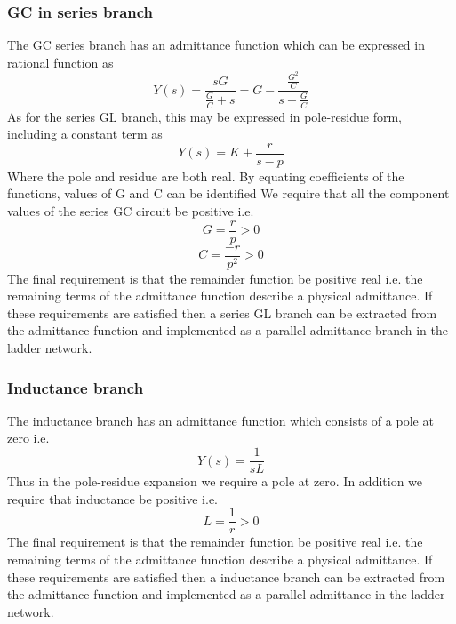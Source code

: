 \subsubsection{GC in series branch}

The GC series branch has an admittance function which can be expressed in rational function as
\begin{equation} 
Y\left(s\right)=\frac{sG}{\frac{G}{C} + s}=G-\frac{\frac{G^2}{C}}{s+\frac{G}{C}}
\end{equation}
As for the series GL branch, this may be expressed in pole-residue form, including a constant term as
\begin{equation} 
Y\left(s\right)= K+\frac{r}{s-p}
\end{equation}
Where the pole and residue are both real. By equating coefficients of the functions, values of G and C can be identified
We require that all the component values of the series GC circuit be positive i.e.
\begin{equation} 
G=\frac{r}{p}>0
\end{equation}
\begin{equation} 
C=\frac{-r}{p^2}>0
\end{equation}
The final requirement is that the remainder function be positive real i.e. the remaining terms of the admittance function describe a physical admittance. If these requirements are satisfied then a series GL branch can be extracted from the admittance function and implemented as a parallel admittance branch in the ladder network. 


\subsubsection{Inductance branch}

The inductance branch has an admittance function which consists of a pole at zero i.e.
\begin{equation} 
Y\left(s\right)=\frac{1}{sL}
\end{equation}
Thus in the pole-residue expansion we require a pole at zero. In addition we require that inductance be positive i.e.
\begin{equation} 
L=\frac{1}{r}>0
\end{equation}
The final requirement is that the remainder function be positive real i.e. the remaining terms of the admittance function describe a physical admittance. If these requirements are satisfied then a inductance branch can be extracted from the admittance function and implemented as a parallel admittance in the ladder network. 


